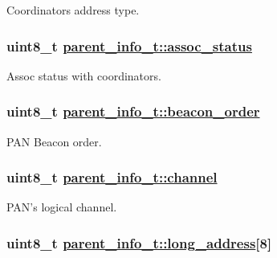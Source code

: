 Coordinators address type. \hypertarget{structparent__info__t_e80be53cbd7445e949750ba876bb58d4}{
\subsubsection[assoc\_\-status]{\setlength{\rightskip}{0pt plus 5cm}uint8\_\-t \hyperlink{structparent__info__t_e80be53cbd7445e949750ba876bb58d4}{parent\_\-info\_\-t::assoc\_\-status}}}
\label{structparent__info__t_e80be53cbd7445e949750ba876bb58d4}


Assoc status with coordinators. \hypertarget{structparent__info__t_c81216fe7fa10fa4c5795b8232f83693}{
\subsubsection[beacon\_\-order]{\setlength{\rightskip}{0pt plus 5cm}uint8\_\-t \hyperlink{structparent__info__t_c81216fe7fa10fa4c5795b8232f83693}{parent\_\-info\_\-t::beacon\_\-order}}}
\label{structparent__info__t_c81216fe7fa10fa4c5795b8232f83693}


PAN Beacon order. \hypertarget{structparent__info__t_d72715c9782a3187d18476f0b83218f2}{
\subsubsection[channel]{\setlength{\rightskip}{0pt plus 5cm}uint8\_\-t \hyperlink{structparent__info__t_d72715c9782a3187d18476f0b83218f2}{parent\_\-info\_\-t::channel}}}
\label{structparent__info__t_d72715c9782a3187d18476f0b83218f2}


PAN's logical channel. \hypertarget{structparent__info__t_52ebeb2739e698a13dead67e3482ad7d}{
\subsubsection[long\_\-address]{\setlength{\rightskip}{0pt plus 5cm}uint8\_\-t \hyperlink{structparent__info__t_52ebeb2739e698a13dead67e3482ad7d}{parent\_\-info\_\-t::long\_\-address}\mbox{[}8\mbox{]}}}
\label{structparent__info__t_52ebeb2739e698a13dead67e3482ad7d}


